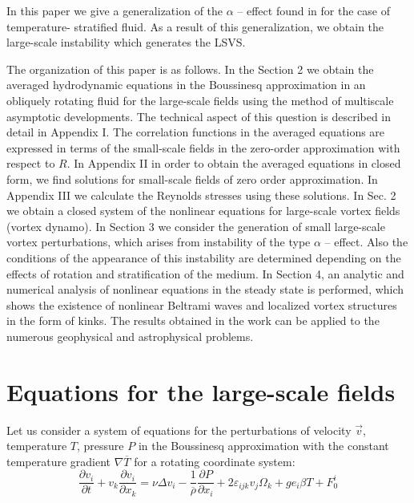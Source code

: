 \documentclass [12pt]{article}
\begin{document}
In this paper we give a generalization of the $\alpha $ -- effect found in \cite{21s} for the case of temperature- stratified fluid. As a result of this generalization, we obtain the large-scale instability which generates the LSVS.

The organization of this paper is as follows. In the Section 2 we obtain the averaged hydrodynamic equations in the Boussinesq approximation in an obliquely rotating fluid for the large-scale fields using the method of multiscale asymptotic developments. The technical aspect of this question is described in detail in Appendix I. The correlation functions in the averaged equations are expressed in terms of the small-scale fields in the zero-order approximation with respect to $R$. In Appendix II in order to obtain the averaged equations in closed form, we find solutions for small-scale fields of zero order approximation. In Appendix III we calculate the Reynolds stresses using these solutions. In Sec. 2 we obtain a closed system of the nonlinear equations for large-scale vortex fields (vortex dynamo). In Section 3 we consider the generation of small large-scale vortex perturbations, which arises from instability of the type $\alpha$ -- effect. Also the conditions of the appearance of this instability are determined depending on the effects of rotation and stratification of the medium. In Section 4, an analytic and numerical analysis of nonlinear equations in the steady state is performed, which shows the existence of nonlinear Beltrami waves and localized vortex structures in the form of kinks. The results obtained in the work can be applied to the numerous geophysical and astrophysical problems.

\section{  Equations for the large-scale fields}

Let us consider a system of equations for the perturbations of velocity $\vec{v}$, temperature  $T$, pressure $P$ in the Boussinesq approximation  with the constant temperature gradient $\nabla \overline{T}$  for a rotating coordinate system:
\begin{equation} \label{eq1}
  \frac{\partial v_{i} }{\partial t} +v_{k} \frac{
\partial v_{i} }{\partial x_{k} } =\nu \Delta v_{i} -\frac{1}{\overline{\rho }} \frac{
\partial P}{\partial x_{i} } +2\varepsilon _{ijk} v_{j} { \Omega }_{k} +ge_{i}
\beta T+F_{0}^{i}
\end{equation}
\end{document}
